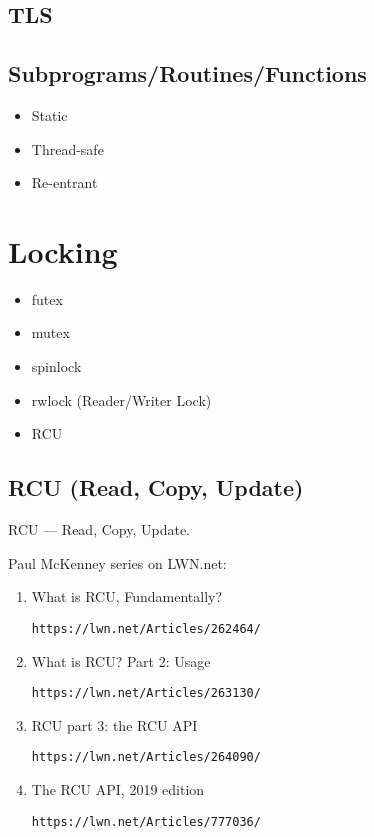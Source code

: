 \documentclass{article}
\begin{document}
\subsection{TLS}

\subsection{Subprograms/Routines/Functions}

\begin{itemize}
\item Static
\item Thread-safe
\item Re-entrant
\end{itemize}

\section{Locking}

\begin{itemize}
\item futex
\item mutex
\item spinlock
\item rwlock (Reader/Writer Lock)
\item RCU
\end{itemize}

\subsection{RCU (Read, Copy, Update)}

RCU --- Read, Copy, Update.

Paul McKenney series on LWN.net:

\begin{enumerate}

\item What is RCU, Fundamentally?

	\texttt{https://lwn.net/Articles/262464/}

\item What is RCU? Part 2: Usage

	\texttt{https://lwn.net/Articles/263130/}

\item RCU part 3: the RCU API

	\texttt{https://lwn.net/Articles/264090/}

\item The RCU API, 2019 edition

	\texttt{https://lwn.net/Articles/777036/}

\end{enumerate}
\end{document}
